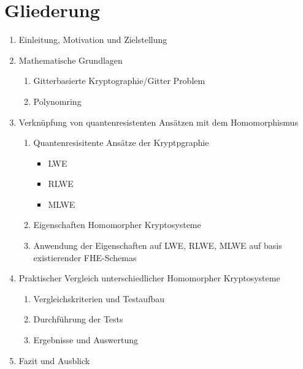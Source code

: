 \chapter{Gliederung}
\label{Grob-Gliederung}

\begin{enumerate}
  \item Einleitung, Motivation und Zielstellung
  \item Mathematische Grundlagen
        \begin{enumerate}
          \item Gitterbasierte Kryptographie/Gitter Problem
          \item Polynomring
        \end{enumerate}
  \item Verknüpfung von quantenresistenten Ansätzen mit dem Homomorphismus
        \begin{enumerate}
          \item Quantenresisitente Ansätze der Kryptpgraphie
                \begin{itemize}
                  \item LWE
                  \item RLWE
                  \item MLWE
                \end{itemize}
          \item Eigenschaften Homomorpher Kryptosysteme
          \item Anwendung der Eigenschaften auf LWE, RLWE, MLWE auf basis existierender FHE-Schemas
        \end{enumerate}
  \item Praktischer Vergleich unterschiedlicher Homomorpher Kryptosysteme
        \begin{enumerate}
          \item Vergleichskriterien und Testaufbau
          \item Durchführung der Tests
          \item Ergebnisse und Auswertung
        \end{enumerate}
  \item Fazit und Ausblick
\end{enumerate}

